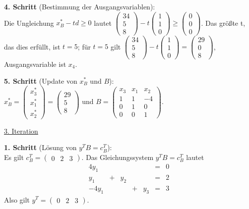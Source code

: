 \documentclass[10pt,a4paper,oneside,ngerman,numbers=noenddot]{scrartcl}
\begin{document}
		\textbf{4. Schritt} (Bestimmung der Ausgangsvariablen):\\
		Die Ungleichung $x_{B}^{*} - td \geq 0$ lautet $\begin{pmatrix} 34 \\ 5 \\ 8\end{pmatrix} - t \begin{pmatrix}1 \\ 1 \\ 0 \end{pmatrix} \geq \begin{pmatrix} 0 \\ 0 \\ 0 \end{pmatrix}$. Das größte t, das dies erfüllt, ist $t = 5$; für $t = 5$ gilt $\begin{pmatrix} 34 \\ 5 \\ 8\end{pmatrix} - t \begin{pmatrix}1 \\ 1 \\ 0 \end{pmatrix} = \begin{pmatrix} 29 \\ 0 \\ 8 \end{pmatrix}$, Ausgangsvariable ist $x_{4}$.
		
		\textbf{5. Schritt} (Update von $x_{B}^{*}$ und $B$):\\
		$x_{B}^{*} = \begin{pmatrix} x_{3}^{*} \\ x_{1}^{*} \\ x_{2}^{*} \end{pmatrix} = \begin{pmatrix} 29 \\ 5 \\ 8 \end{pmatrix}$ und $B = \begin{pmatrix} x_{3} & x_{1} & x_{2} \\ 1 & 1 & -4 \\ 0 & 1 & 0 \\ 0 & 0 & 1 \end{pmatrix}$.
		
		\underline{3. Iteration}
		
		\textbf{1. Schritt} (Lösung von $y^{T}B = c_{B}^{T}$):\\
		Es gilt $c_{B}^{T} = \begin{pmatrix} 0 & 2 & 3 \end{pmatrix}$. Das Gleichungssystem $y^{T}B = c_{B}^{T}$ lautet
		\begin{alignat*}{4}
			y_{1} && && &=& 0 \\
			y_{1} &+& y_{2} && &=& 2 \\
			-4y_{1} && &+& y_{3} &=& 3
		\end{alignat*}
		Also gilt $y^{T} = \begin{pmatrix} 0 & 2 & 3 \end{pmatrix}$.
		
\end{document}
